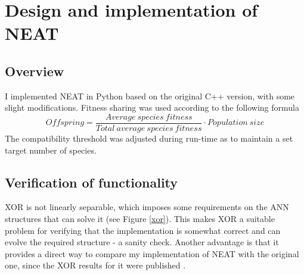 \newpage

\section{Design and implementation of NEAT}

\subsection{Overview}
I implemented NEAT in Python based on the original C++ version, with some slight modifications.
Fitness sharing was used according to the following formula
\begin{equation*} \label{eq:1}
    Offspring = \frac{Average\:species\:fitness}{Total\:average\:species\:fitness} \cdot Population\:size
\end{equation*}
The compatibility threshold was adjusted during run-time as to maintain a set target number of species.

\subsection{Verification of functionality}
XOR is not linearly separable, which imposes some requirements on the ANN structures that can solve it (see Figure \ref{xor}).
This makes XOR a suitable problem for verifying that the implementation is somewhat correct and can evolve
the required structure - a sanity check. Another advantage is that it provides a direct way to compare my
implementation of NEAT with the original one, since the XOR results for it were published \cite{neat_main}.


